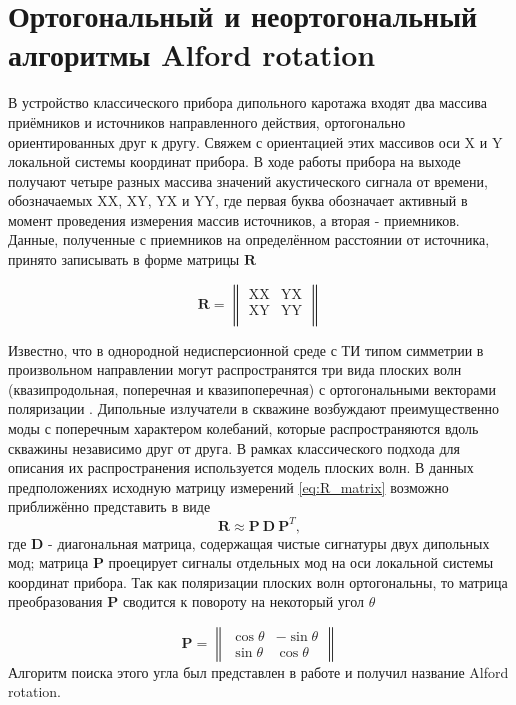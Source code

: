 \documentclass[a4paper,11pt]{article}
\begin{document}
\section{Ортогональный и неортогональный алгоритмы Alford rotation}
В устройство классического прибора дипольного каротажа входят два массива приёмников и источников направленного действия, ортогонально ориентированных друг к другу. Свяжем с ориентацией этих массивов оси X и Y локальной системы координат прибора. В ходе работы прибора на выходе получают четыре разных массива значений акустического сигнала от времени, обозначаемых XX, XY, YX и YY, где первая буква обозначает активный в момент проведения измерения массив источников, а вторая - приемников. Данные, полученные с приемников на определённом расстоянии от источника, принято записывать в форме матрицы $\mathbf{R}$ 

\begin{equation}
	\mathbf{R} = \left\|
	\begin{array}{cc}
	\text{XX} & \text{YX} \\
	\text{XY} & \text{YY} \\
	\end{array}
	\right\| 
	\label{eq:R_matrix}
\end{equation}

Известно, что в однородной недисперсионной среде с ТИ типом симметрии в произвольном направлении могут распространятся три вида плоских волн (квазипродольная, поперечная и квазипоперечная) с ортогональными векторами поляризации%
. Дипольные излучатели в скважине возбуждают преимущественно моды с поперечным характером колебаний, которые распространяются вдоль скважины независимо друг от друга. В рамках классического подхода для описания их распространения используется модель плоских волн.  В данных предположениях исходную матрицу измерений \eqref{eq:R_matrix} возможно приближённо представить в виде \cite{Dellinger1998}
\begin{equation}
	\mathbf{R} \approx \mathbf{P} \ \mathbf{D} \ \mathbf{P}^T, \label{eq:alford_symmetric} 
\end{equation}
где $\mathbf{D}$ - диагональная матрица, содержащая чистые сигнатуры двух дипольных мод; матрица $\mathbf{P}$ проецирует сигналы отдельных мод на оси локальной системы координат прибора. Так как поляризации плоских волн ортогональны, то матрица преобразования $\mathbf{P}$ сводится к повороту на некоторый угол $\theta$

\begin{equation*}
	\mathbf{P} = \left\|
	\begin{array}{cc}
	\cos \theta &-\sin \theta \\ 
	\sin \theta & \cos \theta
	\end{array} 
	\right\| 
\end{equation*}
Алгоритм поиска этого угла был представлен в работе \cite{Alford1986} и получил название Alford rotation.
\end{document}
